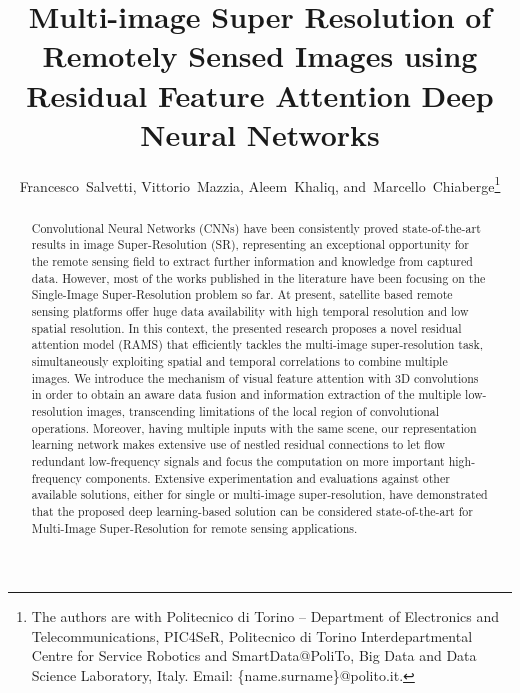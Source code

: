 \documentclass[journal]{IEEEtran}
\begin{document}
\title{Multi-image Super Resolution of Remotely Sensed Images using Residual Feature Attention Deep Neural Networks}


\author{Francesco~Salvetti,
        Vittorio~Mazzia, Aleem~Khaliq,
        and~Marcello~Chiaberge\thanks{The authors are with Politecnico di Torino -- Department of Electronics and Telecommunications, PIC4SeR, Politecnico di Torino Interdepartmental Centre for Service Robotics and SmartData@PoliTo, Big Data and Data Science Laboratory, Italy. Email: \{name.surname\}@polito.it.}}




















\maketitle

\begin{abstract}
Convolutional Neural Networks (CNNs) have been consistently proved state-of-the-art results in image Super-Resolution (SR), representing an exceptional opportunity for the remote sensing field to extract further information and knowledge from captured data. However, most of the works published in the literature have been focusing on the Single-Image Super-Resolution problem so far. At present, satellite based remote sensing platforms offer huge data availability with high temporal resolution and low spatial resolution. In this context, the presented research proposes a novel residual attention model (RAMS) that efficiently tackles the multi-image super-resolution task, simultaneously exploiting spatial and temporal correlations to combine multiple images. We introduce the mechanism of visual feature attention with 3D convolutions in order to obtain an aware data fusion and information extraction of the multiple low-resolution images, transcending limitations of the local region of convolutional operations. Moreover, having multiple inputs with the same scene, our representation learning network makes extensive use of nestled residual connections to let flow redundant low-frequency signals and focus the computation on more important high-frequency components. Extensive experimentation and evaluations against other available solutions, either for single or multi-image super-resolution, have demonstrated that the proposed deep learning-based solution can be considered state-of-the-art for Multi-Image Super-Resolution for remote sensing applications.
\end{abstract}
\end{document}
